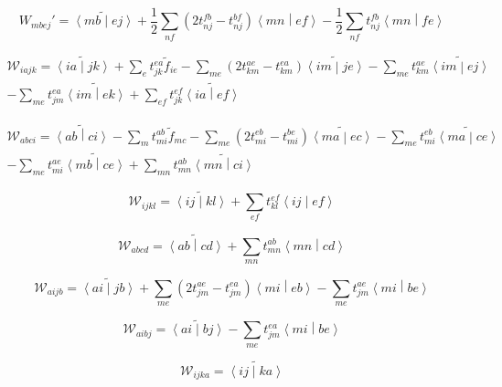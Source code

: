 \documentclass{article}
\begin{document}
\begin{equation}
  W_{mbej}' = \widetilde{\left<mb\middle|ej\right>} + \frac{1}{2}\sum_{nf}\left(2t_{nj}^{fb} - t_{nj}^{bf}\right)\left<mn\middle|ef\right> - \frac{1}{2}\sum_{nf}t_{nj}^{fb}\left<mn\middle|fe\right>
\end{equation}

\begin{multline}
  \mathcal{W}_{iajk} = \widetilde{\left<ia\middle|jk\right>} + \sum_et_{jk}^{ea}\tilde{f}_{ie} - \sum_{me}\left(2t_{km}^{ae} - t_{km}^{ea}\right)\widetilde{\left<im\middle|je\right>} - \sum_{me}t_{km}^{ae}\widetilde{\left<im\middle|ej\right>} \\
  - \sum_{me}t_{jm}^{ea}\widetilde{\left<im\middle|ek\right>} + \sum_{ef}t_{jk}^{ef}\widetilde{\left<ia\middle|ef\right>}
\end{multline}

\begin{multline}
  \mathcal{W}_{abci} = \widetilde{\left<ab\middle|ci\right>} - \sum_mt_{mi}^{ab}\tilde{f}_{mc} - \sum_{me}\left(2t_{mi}^{eb} - t_{mi}^{be}\right)\widetilde{\left<ma\middle|ec\right>} - \sum_{me}t_{mi}^{eb}\widetilde{\left<ma\middle|ce\right>} \\
  - \sum_{me}t_{mi}^{ae}\widetilde{\left<mb\middle|ce\right>} + \sum_{mn}t_{mn}^{ab}\widetilde{\left<mn\middle|ci\right>}
\end{multline}

\begin{equation}
  \mathcal{W}_{ijkl} = \widetilde{\left<ij\middle|kl\right>} + \sum_{ef}t_{kl}^{ef}\left<ij\middle|ef\right>
\end{equation}

\begin{equation}
  \mathcal{W}_{abcd} = \widetilde{\left<ab\middle|cd\right>} + \sum_{mn}t_{mn}^{ab}\left<mn\middle|cd\right>
\end{equation}

\begin{equation}
  \mathcal{W}_{aijb} = \widetilde{\left<ai\middle|jb\right>} + \sum_{me}\left(2t_{jm}^{ae} - t_{jm}^{ea}\right)\left<mi\middle|eb\right> - \sum_{me}t_{jm}^{ae}\left<mi\middle|be\right>
\end{equation}

\begin{equation}
  \mathcal{W}_{aibj} = \widetilde{\left<ai\middle|bj\right>} - \sum_{me}t_{jm}^{ea}\left<mi\middle|be\right>
\end{equation}

\begin{equation}
  \mathcal{W}_{ijka} = \widetilde{\left<ij\middle|ka\right>}
\end{equation}
\end{document}
